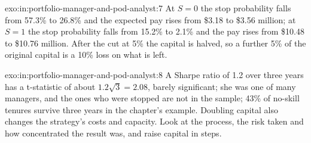 \begin{solution}{exo:in:portfolio-manager-and-pod-analyst:7}
At $S=0$ the stop probability falls from 57.3\% to 26.8\% and the expected pay rises from \$3.18 to \$3.56 million; at
$S=1$ the stop probability falls from 15.2\% to 2.1\% and the pay rises from \$10.48 to \$10.76 million. After the cut at
5\% the capital is halved, so a further 5\% of the original capital is a 10\% loss on what is left.
\end{solution}

\begin{solution}{exo:in:portfolio-manager-and-pod-analyst:8}
A Sharpe ratio of 1.2 over three years has a t-statistic of about $1.2\sqrt3=2.08$, barely significant; she was one of
many managers, and the ones who were stopped are not in the sample; 43\% of no-skill tenures survive three years in the
chapter's example. Doubling capital also changes the strategy's costs and capacity. Look at the process, the risk taken
and how concentrated the result was, and raise capital in steps.
\end{solution}


